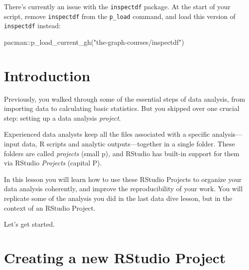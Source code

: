 \documentclass[
  letterpaper,
  DIV=11,
  numbers=noendperiod]{scrreprt}
\newenvironment{Shaded}{\begin{snugshade}}{\end{snugshade}}
\newcommand{\FunctionTok}[1]{\textcolor[rgb]{0.28,0.35,0.67}{#1}}
\newcommand{\NormalTok}[1]{\textcolor[rgb]{0.00,0.23,0.31}{#1}}
\newcommand{\SpecialCharTok}[1]{\textcolor[rgb]{0.37,0.37,0.37}{#1}}
\newcommand{\StringTok}[1]{\textcolor[rgb]{0.13,0.47,0.30}{#1}}
\begin{document}
\begin{tcolorbox}[enhanced jigsaw, title=\textcolor{quarto-callout-warning-color}{\faExclamationTriangle}\hspace{0.5em}{⚠️ NOTICE ⚠️}, colbacktitle=quarto-callout-warning-color!10!white, leftrule=.75mm, arc=.35mm, opacityback=0, bottomrule=.15mm, rightrule=.15mm, toptitle=1mm, breakable, toprule=.15mm, colback=white, coltitle=black, colframe=quarto-callout-warning-color-frame, bottomtitle=1mm, titlerule=0mm, left=2mm, opacitybacktitle=0.6]

There's currently an issue with the \texttt{inspectdf} package. At the
start of your script, remove \texttt{inspectdf} from the
\texttt{p\_load} command, and load this version of \texttt{inspectdf}
instead:

\begin{Shaded}
\begin{Highlighting}[]
\NormalTok{pacman}\SpecialCharTok{::}\FunctionTok{p\_load\_current\_gh}\NormalTok{(}\StringTok{"the{-}graph{-}courses/inspectdf"}\NormalTok{)}
\end{Highlighting}
\end{Shaded}

\end{tcolorbox}

\section{Introduction}\label{introduction-5}

Previously, you walked through some of the essential steps of data
analysis, from importing data to calculating basic statistics. But you
skipped over one crucial step: setting up a data analysis
\emph{project}.

Experienced data analysts keep all the files associated with a specific
analysis---input data, R scripts and analytic outputs---together in a
single folder. These folders are called \emph{projects} (small
p)\emph{,} and RStudio has built-in support for them via RStudio
\emph{Projects} (capital P).

In this lesson you will learn how to use these RStudio Projects to
organize your data analysis coherently, and improve the reproducibility
of your work. You will replicate some of the analysis you did in the
last data dive lesson, but in the context of an RStudio Project.

Let's get started.

\section{Creating a new RStudio
Project}\label{creating-a-new-rstudio-project}
\end{document}
